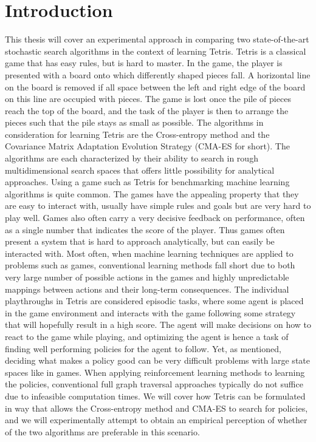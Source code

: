 \vspace*{0em}
\section{Introduction \label{sec:intro}}

This thesis will cover an experimental approach 
in comparing two state-of-the-art stochastic search
algorithms in the context of learning Tetris. 
Tetris is a classical game that has easy rules, but
is hard to master. In the game, the player is presented with
a board onto which differently shaped pieces fall. 
A horizontal line on the board is removed if all space between
the left and right edge of the board on this line are occupied with pieces.
The game is lost once the pile of pieces reach the top of the board,
and the task of the player is then to arrange the pieces such that
the pile stays as small as possible. 
The algorithms in consideration for learning Tetris
are the Cross-entropy method and 
the Covariance Matrix Adaptation Evolution Strategy (CMA-ES
for short). The algorithms are each characterized by their
ability to search in rough multidimensional 
search spaces that offers little possibility 
for analytical approaches.
Using a game such as Tetris for benchmarking machine learning
algorithms is quite common. The games have the appealing property 
that they are easy to interact with, usually have simple rules and 
goals but are very hard to play well. Games also often carry
a very decisive feedback on performance, often as a single number that 
indicates the score of the player. Thus games often present a system 
that is hard to approach analytically, but can easily be interacted with.
Most often, when machine learning
techniques are applied to problems such as games, conventional
learning methods fall short due to both  very large number of 
possible actions in the games and highly unpredictable mappings 
between actions and their long-term consequences. The individual playthroughs
in Tetris are considered episodic tasks, where some agent is placed
in the game environment and interacts with the game following some
strategy that will hopefully result in a high score. 
The agent will make decisions on how to react 
to the game while playing, and optimizing the agent is hence a task of
finding well performing policies for the agent to follow. Yet, as mentioned,
deciding what makes a policy good can be very difficult problems 
with large state spaces like in games. When applying reinforcement learning methods to learning
the policies, conventional full graph traversal approaches typically do not suffice 
due to infeasible computation times. We will cover how
Tetris can be formulated in way that allows  the Cross-entropy method 
and CMA-ES to search for policies, and we will experimentally 
attempt to obtain an empirical perception of whether of the two algorithms
are preferable in this scenario.









